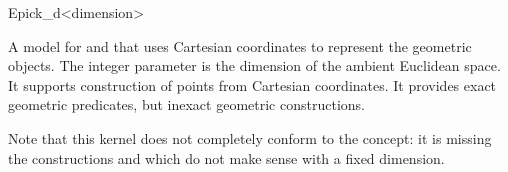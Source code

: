 \begin{ccRefClass}{Epick_d<dimension>}


\ccDefinition
A model for  and  that
uses Cartesian coordinates to represent the geometric objects.  The
integer parameter  is the dimension of the ambient
Euclidean space. It supports construction of points from 
Cartesian coordinates. It provides exact geometric predicates, but
inexact geometric constructions.

Note that this kernel does not completely conform to the 
concept: it is missing the constructions  and
 which do not make sense with a fixed
dimension.

\ccIsModel
{}


\ccSeeAlso
{}




\end{ccRefClass}
